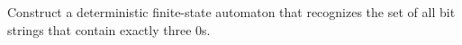 \documentclass[../main.tex]{subfiles}
\begin{document}
Construct a deterministic finite-state automaton that recognizes the set of all bit strings that contain exactly three $0$s.

\solution
\end{document}
